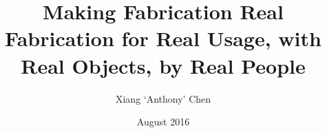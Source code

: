 \documentclass[12pt]{cmuthesis}
\begin{document}
\frontmatter

\pagestyle{empty}

\title{ %
{\bf Making Fabrication Real}\\
{Fabrication for Real Usage, with Real Objects, by Real People}}
\author{Xiang `Anthony' Chen}
\date{August 2016}
\trnumber{}


\support{}
\disclaimer{}



\maketitle

\begin{dedication}
\end{dedication}

\pagestyle{plain} %

\end{document}
